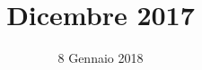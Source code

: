 


\title{ Dicembre 2017}
\author{\GroupName}

\date{8 Gennaio 2018}



\frenchspacing

\makeFrontPage



